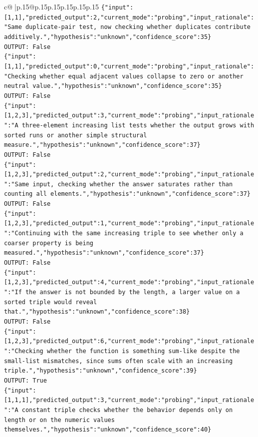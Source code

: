 \documentclass{article}
\begin{document}
{\begin{supertabular}{c@{$\;$}|p{.15\linewidth}@{}p{.15\linewidth}p{.15\linewidth}p{.15\linewidth}p{.15\linewidth}p{.15\linewidth}}
{{{\texttt{\{"input":{[}1,1{]},"predicted\_output":2,"current\_mode":"probing","input\_rationale":"Same duplicate{-}pair test, now checking whether duplicates contribute additively.","hypothesis":"unknown","confidence\_score":35\}} \\
\texttt{OUTPUT: False} \\
\texttt{\{"input":{[}1,1{]},"predicted\_output":0,"current\_mode":"probing","input\_rationale":"Checking whether equal adjacent values collapse to zero or another neutral value.","hypothesis":"unknown","confidence\_score":35\}} \\
\texttt{OUTPUT: False} \\
\texttt{\{"input":{[}1,2,3{]},"predicted\_output":3,"current\_mode":"probing","input\_rationale":"A three{-}element increasing list tests whether the output grows with sorted runs or another simple structural measure.","hypothesis":"unknown","confidence\_score":37\}} \\
\texttt{OUTPUT: False} \\
\texttt{\{"input":{[}1,2,3{]},"predicted\_output":2,"current\_mode":"probing","input\_rationale":"Same input, checking whether the answer saturates rather than counting all elements.","hypothesis":"unknown","confidence\_score":37\}} \\
\texttt{OUTPUT: False} \\
\texttt{\{"input":{[}1,2,3{]},"predicted\_output":1,"current\_mode":"probing","input\_rationale":"Continuing with the same increasing triple to see whether only a coarser property is being measured.","hypothesis":"unknown","confidence\_score":37\}} \\
\texttt{OUTPUT: False} \\
\texttt{\{"input":{[}1,2,3{]},"predicted\_output":4,"current\_mode":"probing","input\_rationale":"If the answer is not bounded by the length, a larger value on a sorted triple would reveal that.","hypothesis":"unknown","confidence\_score":38\}} \\
\texttt{OUTPUT: False} \\
\texttt{\{"input":{[}1,2,3{]},"predicted\_output":6,"current\_mode":"probing","input\_rationale":"Checking whether the function is something sum{-}like despite the small{-}list mismatches, since sums often scale with an increasing triple.","hypothesis":"unknown","confidence\_score":39\}} \\
\texttt{OUTPUT: True} \\
\texttt{\{"input":{[}1,1,1{]},"predicted\_output":3,"current\_mode":"probing","input\_rationale":"A constant triple checks whether the behavior depends only on length or on the numeric values themselves.","hypothesis":"unknown","confidence\_score":40\}} \\
}}}
\end{supertabular}}
\end{document}
